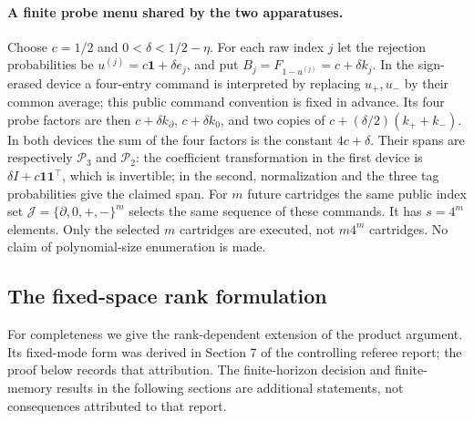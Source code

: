 \paragraph{A finite probe menu shared by the two apparatuses.}
Choose $c=1/2$ and $0<\delta<1/2-\eta$. For each raw index $j$ let the
rejection probabilities be $u^{(j)}=c\mathbf1+\delta e_j$, and put
$B_j=F_{1-u^{(j)}}=c+\delta k_j$. In the sign-erased device a four-entry
command is interpreted by replacing $u_+,u_-$ by their common average;
this public command convention is fixed in advance. Its four probe factors
are then $c+\delta k_\partial$, $c+\delta k_0$, and two copies of
$c+(\delta/2)(k_++k_-)$. In both devices the sum of the four factors is the
constant $4c+\delta$. Their spans are respectively $\mathcal P_3$ and
$\mathcal P_2$: the coefficient transformation in the first device is
$\delta I+c\mathbf1\mathbf1^\top$, which is invertible; in the second,
normalization and the three tag probabilities give the claimed span.
For $m$ future cartridges the same public index set
$\mathcal J=\{\partial,0,+,-\}^m$ selects the same sequence of these
commands. It has $s=4^m$ elements. Only the selected $m$ cartridges are
executed, not $m4^m$ cartridges. No claim of polynomial-size enumeration is
made.

\subsection{The fixed-space rank formulation}
For completeness we give the rank-dependent extension of the product
argument. Its fixed-mode form was derived in Section 7 of the controlling
referee report; the proof below records that attribution. The finite-horizon
decision and finite-memory results in the following sections are additional
statements, not consequences attributed to that report.


